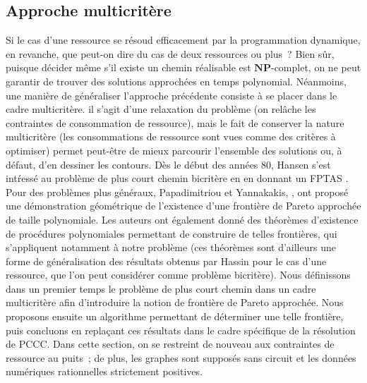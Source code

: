 \documentclass[10pt,francais]{llncs}
\begin{document}
{\subsection{Approche multicrit\`ere}\label{sub-approx-multiobj}
Si le cas d'une ressource se r\'esoud efficacement par la programmation dynamique, en revanche, que peut-on dire du cas de deux ressources ou plus~? Bien s\^ur, puisque d\'ecider m\^eme s'il existe un chemin r\'ealisable est $\mathbf{NP}$-complet, on ne peut garantir de trouver des solutions approch\'ees en temps polynomial. N\'eanmoins, une mani\`ere de g\'en\'eraliser l'approche pr\'ec\'edente consiste \`a se placer dans le cadre multicrit\`ere. il s'agit d'une relaxation du probl\`eme (on rel\^ache les contraintes de consommation de ressource), mais le fait de conserver la nature multicrit\`ere (les consommations de ressource sont vues comme des crit\`eres \`a optimiser) permet peut-\^etre de mieux parcourir l'ensemble des solutions ou, \`a d\'efaut, d'en dessiner les contours. D\`es le d\'ebut des ann\'ees 80, Hansen s'est int\'ress\'e au probl\`eme de plus court chemin bicrit\`ere en en donnant un FPTAS \cite{Hansen1980}. Pour des probl\`emes plus g\'en\'eraux, Papadimitriou et Yannakakis, \cite{Papadimitriou2000}, ont propos\'e une d\'emonstration g\'eom\'etrique de l'existence d'une fronti\`ere de Pareto approch\'ee de taille polynomiale. Les auteurs ont \'egalement donn\'e des th\'eor\` emes d'existence de proc\'edures polynomiales permettant de construire de telles fronti\`eres, qui s'appliquent notamment \`a notre probl\`eme (ces th\'eor\`emes sont d'ailleurs une forme de g\'en\'eralisation des r\'esultats obtenus par Hassin pour le cas d'une ressource, que l'on peut consid\'erer comme probl\`eme bicrit\`ere). Nous d\'efinissons dans un premier temps le probl\`eme de plus court chemin dans un cadre multicrit\`ere afin d'introduire la notion de fronti\`ere de Pareto approch\'ee. Nous proposons ensuite un algorithme permettant de d\'eterminer une telle fronti\`ere, puis concluons en repla\c{c}ant ces r\'esultats dans le cadre sp\'ecifique de la r\'esolution de \textsc{PCCC}. Dans cette section, on se restreint de nouveau aux contraintes de ressource au puits~; de plus, les graphes sont suppos\'es sans circuit et les donn\'ees num\'eriques rationnelles strictement positives.  


}
\end{document}
